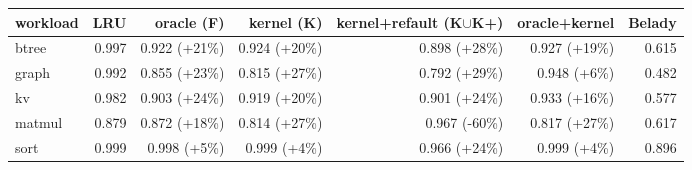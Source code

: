 \begin{tabular}{lrrrrrr}
\toprule
workload & LRU & oracle (F) & kernel (K) & kernel{+}refault (K$\cup$K{+}) & oracle{+}kernel & Belady \\
\midrule
btree & 0.997 & 0.922 ({+}21\%) & 0.924 ({+}20\%) & 0.898 ({+}28\%) & 0.927 ({+}19\%) & 0.615 \\
graph & 0.992 & 0.855 ({+}23\%) & 0.815 ({+}27\%) & 0.792 ({+}29\%) & 0.948 ({+}6\%) & 0.482 \\
kv & 0.982 & 0.903 ({+}24\%) & 0.919 ({+}20\%) & 0.901 ({+}24\%) & 0.933 ({+}16\%) & 0.577 \\
matmul & 0.879 & 0.872 ({+}18\%) & 0.814 ({+}27\%) & 0.967 (-60\%) & 0.817 ({+}27\%) & 0.617 \\
sort & 0.999 & 0.998 ({+}5\%) & 0.999 ({+}4\%) & 0.966 ({+}24\%) & 0.999 ({+}4\%) & 0.896 \\
\bottomrule
\end{tabular}
